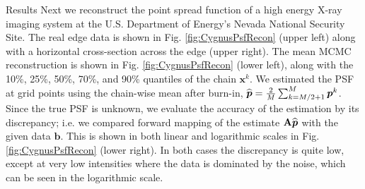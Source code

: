 \begin{chapter}{Results}
Next we reconstruct the point spread function of a high energy X-ray imaging system at the U.S. Department of Energy's Nevada National Security Site. The real edge data is shown in Fig. \ref{fig:CygnusPsfRecon} (upper left) along with a horizontal cross-section across the edge (upper right). The mean MCMC reconstruction is shown in Fig. \ref{fig:CygnusPsfRecon} (lower left), along with the 10\%, 25\%, 50\%, 70\%, and 90\% quantiles of the chain $\bm{x}^{k}$.
We estimated the PSF at grid points using the chain-wise mean after burn-in, $\widehat {\mbox{\boldmath$p$}} = \frac 2M \sum_{k=M/2+1}^M {\mbox{\boldmath$p$}}^{k}$.
Since the true PSF is unknown, we evaluate the accuracy of the estimation by its discrepancy; i.e. we compared forward mapping of the estimate ${\bf A} {\widehat{\mbox{\boldmath$p$}}}$ with the given data $\bm b$.  This is shown in both linear and logarithmic scales in Fig. \ref{fig:CygnusPsfRecon} (lower right). In both cases the discrepancy is quite low, except at very low intensities where the data is dominated by the noise, which can be seen in the logarithmic scale.


\end{chapter}
